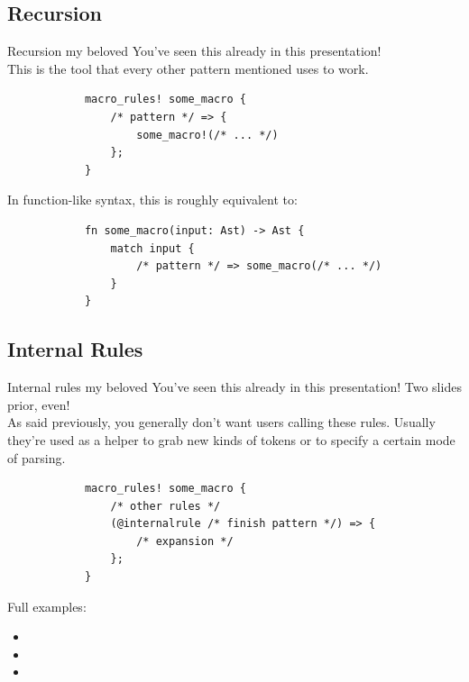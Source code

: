 \documentclass{beamer}
\begin{document}
	\subsection{Recursion}
	\begin{frame}[fragile]{Recursion my beloved}
		You've seen this already in this presentation! \\

		This is the tool that every other pattern mentioned uses to work.

		\begin{verbatim}
			macro_rules! some_macro {
				/* pattern */ => {
					some_macro!(/* ... */)
				};
			}
		\end{verbatim}
		In function-like syntax, this is roughly equivalent to:
		\begin{verbatim}
			fn some_macro(input: Ast) -> Ast {
				match input {
					/* pattern */ => some_macro(/* ... */)
				}
			}
		\end{verbatim}
	\end{frame}

	\subsection{Internal Rules}
	\begin{frame}[fragile]{Internal rules my beloved}
		You've seen this already in this presentation! Two slides prior, even! \\

		As said previously, you generally don't want users calling these rules. Usually they're used
		as a helper to grab new kinds of tokens or to specify a certain mode of parsing.

		\begin{verbatim}
			macro_rules! some_macro {
				/* other rules */
				(@internalrule /* finish pattern */) => {
					/* expansion */
				};
			}
		\end{verbatim}

		Full examples:
		\begin{itemize}
			\item {}
			\item {}
			\item {}
		\end{itemize}
	\end{frame}
\end{document}
